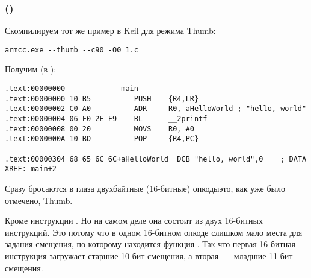 \subsubsection{\NonOptimizingKeilVI (\ThumbMode)}

Скомпилируем тот же пример в Keil для режима Thumb:

\begin{lstlisting}
armcc.exe --thumb --c90 -O0 1.c 
\end{lstlisting}

Получим (в \IDA):

\begin{lstlisting}[caption=\NonOptimizingKeilVI (\ThumbMode) + \IDA]
.text:00000000             main
.text:00000000 10 B5          PUSH    {R4,LR}
.text:00000002 C0 A0          ADR     R0, aHelloWorld ; "hello, world"
.text:00000004 06 F0 2E F9    BL      __2printf
.text:00000008 00 20          MOVS    R0, #0
.text:0000000A 10 BD          POP     {R4,PC}

.text:00000304 68 65 6C 6C+aHelloWorld  DCB "hello, world",0    ; DATA XREF: main+2
\end{lstlisting}

Сразу бросаются в глаза двухбайтные (16-битные) опкоды\EMDASH{}это, как уже было отмечено, Thumb.

Кроме инструкции .
Но на самом деле она состоит из двух 16-битных инструкций.
Это потому что в одном 16-битном опкоде слишком мало места для задания смещения, по которому находится функция \printf.
Так что первая 16-битная инструкция загружает старшие 10 бит смещения, а вторая~--- младшие 11 бит смещения.


